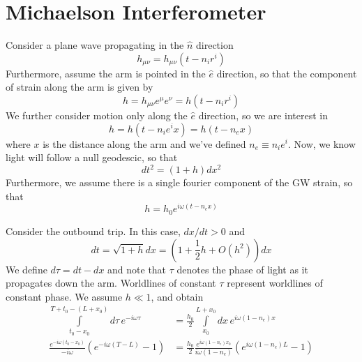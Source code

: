 \documentclass{article}
\begin{document}

\section*{Michaelson Interferometer}

Consider a plane wave propagating in the $\hat{n}$ direction
\begin{equation}
    h_{\mu\nu} = h_{\mu\nu}(t-n_i r^i)
\end{equation}
Furthermore, assume the arm is pointed in the $\hat{e}$ direction, so that the component of strain along the arm is given by
\begin{equation}
    h = h_{\mu\nu}e^\mu e^\nu = h(t-n_i r^i)
\end{equation}
We further consider motion only along the $\hat{e}$ direction, so we are interest in
\begin{equation}
    h = h(t-n_i e^i x) = h(t-n_e x)
\end{equation}
where $x$ is the distance along the arm and we've defined $n_e\equiv n_i e^i$.
Now, we know light will follow a null geodescic, so that
\begin{equation}
    dt^2 = (1+h)dx^2
\end{equation}
Furthermore, we assume there is a single fourier component of the GW strain, so that
\begin{equation}
    h = h_0 e^{i\omega(t-n_e x)}
\end{equation}

Consider the outbound trip.
In this case, $dx/dt > 0$ and
\begin{equation}
    dt = \sqrt{1+h}dx = (1 + \frac{1}{2}h + O(h^2))dx
\end{equation}
We define $d\tau = dt-dx$ and note that $\tau$ denotes the phase of light as it propagates down the arm.
Worldlines of constant $\tau$ represent worldlines of constant phase.
We assume $h\ll1$, and obtain
\begin{align}
    \int\limits_{t_0-x_0}^{T+t_0 - (L+x_0)} d\tau\, e^{-i\omega\tau} & = \frac{h_0}{2} \int\limits_{x_0}^{L+x_0} dx\, e^{i\omega(1-n_e)x} \\
    \frac{e^{-i\omega(t_0-x_0)}}{-i\omega}\left(e^{-i\omega(T-L)} - 1\right) & = \frac{h_0}{2}\frac{e^{i\omega(1-n_e)x_0}}{i\omega(1-n_e)}\left( e^{i\omega(1-n_e)L} - 1 \right)
\end{align}
\end{document}
